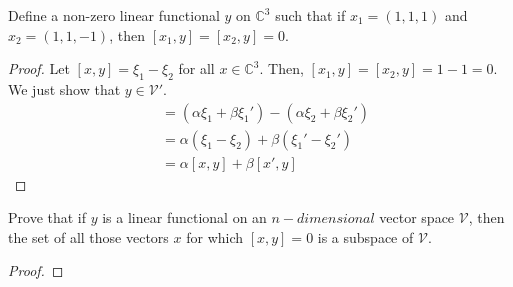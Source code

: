 \documentclass[12pt]{article}
\newenvironment{problem}[2][Problem]{\begin{trivlist} \item[\hskip \labelsep {\bfseries #1}\hskip \labelsep {\bfseries #2.}]}{\end{trivlist}}
\begin{document}
\begin{problem}{1} 
  Define a non-zero linear functional $y$ on $\mathbb{C}^{3}$ such that if $x_{1} = (1,1,1)$ and $x_{2} = (1,1,-1)$, then $[x_{1},y]=[x_{2},y]=0$.
\begin{proof}
  Let $[x,y]=\xi_{1}-\xi_{2}$ for all $x\in\mathbb{C}^{3}$. Then, $[x_{1},y]=[x_{2},y]=1-1=0$. We just show that $y\in \mathcal{V}'$.  
\begin{align*}
  [\alpha x + \beta x',y] &= \left( \alpha\xi_{1}+\beta\xi_{1}' \right)-\left( \alpha\xi_{2}+\beta\xi_{2}' \right)\\
  &= \alpha\left(  \xi_{1}-\xi_{2}\right)+\beta\left( \xi_{1}'-\xi_{2}' \right)\\
  &= \alpha[x,y]+\beta[x',y]
\end{align*}
\end{proof}
\end{problem}
\begin{problem}{3}
  Prove that if $y$ is a linear functional on an $n-dimensional$ vector space $\mathcal{V}$, then the set of all those vectors $x$ for which $[x,y]=0$ is a subspace of $\mathcal{V}$.
\begin{proof}

\end{proof}
\end{problem}
\end{document}
